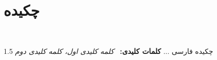 ‎\chapter*{چکیده}‎
\begin{spacing} {1.5}
\noindent
چکیده فارسی ...
\vskip 1cm
\noindent \textbf{کلمات کلیدی:} \
\textit{کلمه کلیدی اول، کلمه کلیدی دوم }

\end{spacing}
